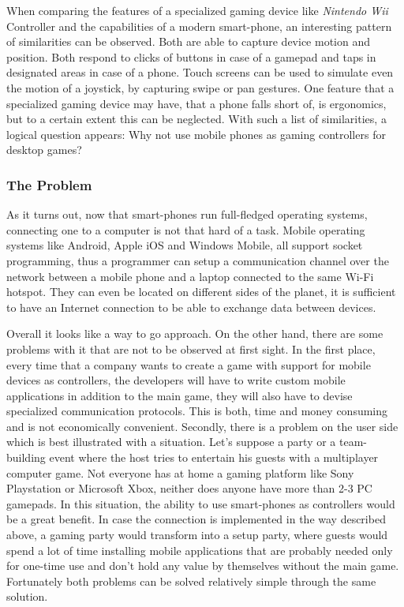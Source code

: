 When comparing the features of a specialized gaming device like \emph{Nintendo
Wii} Controller and the capabilities of a modern smart-phone, an interesting
pattern of similarities can be observed. Both are able to capture device
motion and position. Both respond to clicks of buttons in case of a gamepad
and taps in designated areas in case of a phone. Touch screens can be used to
simulate even the motion of a joystick, by capturing swipe or pan gestures.
One feature that a specialized gaming device may have, that a phone falls
short of, is ergonomics, but to a certain extent this can be neglected. With
such a list of similarities, a logical question appears: Why not use mobile
phones as gaming controllers for desktop games?

\subsubsection{The Problem}

As it turns out, now that smart-phones run full-fledged operating systems,
connecting one to a computer is not that hard of a task. Mobile operating
systems like Android, Apple iOS and Windows Mobile, all support socket
programming, thus a programmer can setup a communication channel over the
network between a mobile phone and a laptop connected to the same Wi-Fi
hotspot. They can even be located on different sides of the planet, it is
sufficient to have an Internet connection to be able to exchange data between
devices.

Overall it looks like a way to go approach. On the other hand, there are some
problems with it that are not to be observed at first sight. In the first
place, every time that a company wants to create a game with support for
mobile devices as controllers, the developers will have to write custom mobile
applications in addition to the main game, they will also have to devise
specialized communication protocols. This is both, time and money consuming
and is not economically convenient. Secondly, there is a problem on the user
side which is best illustrated with a situation. Let's suppose a party or a
team-building event where the host tries to entertain his guests with a
multiplayer computer game. Not everyone has at home a gaming platform like
Sony Playstation or Microsoft Xbox, neither does anyone have more than 2-3 PC
gamepads. In this situation, the ability to use smart-phones as controllers
would be a great benefit. In case the connection is implemented in the way
described above, a gaming party would transform into a setup party, where
guests would spend a lot of time installing mobile applications that are
probably needed only for one-time use and don't hold any value by themselves
without the main game. Fortunately both problems can be solved relatively
simple through the same solution.

